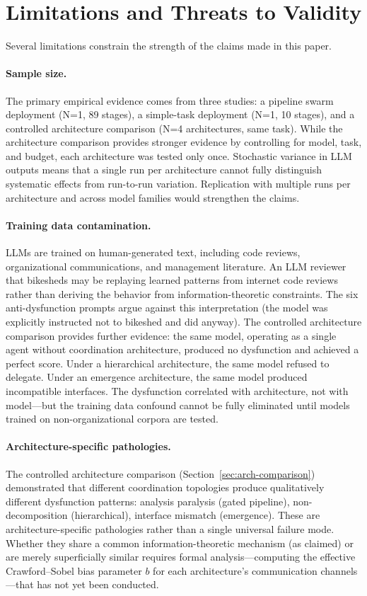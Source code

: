\documentclass[11pt,a4paper]{article}
\begin{document}
\section{Limitations and Threats to Validity}
\label{sec:limitations}

Several limitations constrain the strength of the claims made in this paper.

\paragraph{Sample size.} The primary empirical evidence comes from three studies: a pipeline swarm deployment (N=1, 89 stages), a simple-task deployment (N=1, 10 stages), and a controlled architecture comparison (N=4 architectures, same task). While the architecture comparison provides stronger evidence by controlling for model, task, and budget, each architecture was tested only once. Stochastic variance in LLM outputs means that a single run per architecture cannot fully distinguish systematic effects from run-to-run variation. Replication with multiple runs per architecture and across model families would strengthen the claims.

\paragraph{Training data contamination.} LLMs are trained on human-generated text, including code reviews, organizational communications, and management literature. An LLM reviewer that bikesheds may be replaying learned patterns from internet code reviews rather than deriving the behavior from information-theoretic constraints. The six anti-dysfunction prompts argue against this interpretation (the model was explicitly instructed not to bikeshed and did anyway). The controlled architecture comparison provides further evidence: the same model, operating as a single agent without coordination architecture, produced no dysfunction and achieved a perfect score. Under a hierarchical architecture, the same model refused to delegate. Under an emergence architecture, the same model produced incompatible interfaces. The dysfunction correlated with architecture, not with model---but the training data confound cannot be fully eliminated until models trained on non-organizational corpora are tested.

\paragraph{Architecture-specific pathologies.} The controlled architecture comparison (Section~\ref{sec:arch-comparison}) demonstrated that different coordination topologies produce qualitatively different dysfunction patterns: analysis paralysis (gated pipeline), non-decomposition (hierarchical), interface mismatch (emergence). These are architecture-specific pathologies rather than a single universal failure mode. Whether they share a common information-theoretic mechanism (as claimed) or are merely superficially similar requires formal analysis---computing the effective Crawford--Sobel bias parameter $b$ for each architecture's communication channels---that has not yet been conducted.
\end{document}
